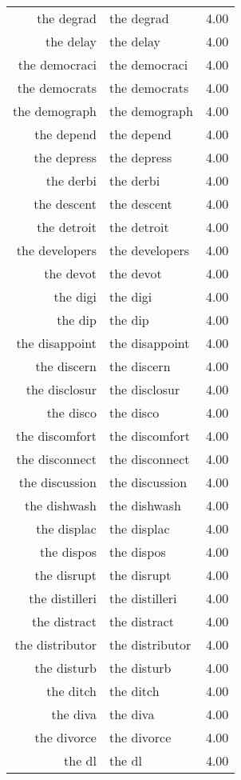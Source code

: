\begin{table}[ht]
\begin{tabular}{rlr}
  the degrad & the degrad & 4.00 \\ 
  the delay & the delay & 4.00 \\ 
  the democraci & the democraci & 4.00 \\ 
  the democrats & the democrats & 4.00 \\ 
  the demograph & the demograph & 4.00 \\ 
  the depend & the depend & 4.00 \\ 
  the depress & the depress & 4.00 \\ 
  the derbi & the derbi & 4.00 \\ 
  the descent & the descent & 4.00 \\ 
  the detroit & the detroit & 4.00 \\ 
  the developers & the developers & 4.00 \\ 
  the devot & the devot & 4.00 \\ 
  the digi & the digi & 4.00 \\ 
  the dip & the dip & 4.00 \\ 
  the disappoint & the disappoint & 4.00 \\ 
  the discern & the discern & 4.00 \\ 
  the disclosur & the disclosur & 4.00 \\ 
  the disco & the disco & 4.00 \\ 
  the discomfort & the discomfort & 4.00 \\ 
  the disconnect & the disconnect & 4.00 \\ 
  the discussion & the discussion & 4.00 \\ 
  the dishwash & the dishwash & 4.00 \\ 
  the displac & the displac & 4.00 \\ 
  the dispos & the dispos & 4.00 \\ 
  the disrupt & the disrupt & 4.00 \\ 
  the distilleri & the distilleri & 4.00 \\ 
  the distract & the distract & 4.00 \\ 
  the distributor & the distributor & 4.00 \\ 
  the disturb & the disturb & 4.00 \\ 
  the ditch & the ditch & 4.00 \\ 
  the diva & the diva & 4.00 \\ 
  the divorce & the divorce & 4.00 \\ 
  the dl & the dl & 4.00 \\ 

\end{tabular}
\end{table}
